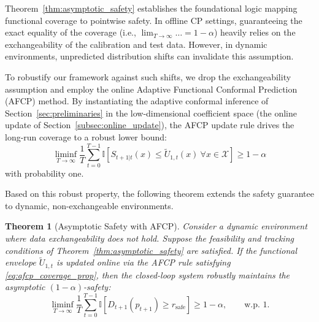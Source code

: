 \documentclass[lettersize,journal]{IEEEtran}
\newtheorem{theorem}{Theorem}
\begin{document}
Theorem~\ref{thm:asymptotic_safety} establishes the foundational logic mapping functional coverage to pointwise safety. In offline CP settings, guaranteeing the exact equality of the coverage (i.e., $\lim_{T\to\infty} \dots = 1-\alpha$) heavily relies on the exchangeability of the calibration and test data. However, in dynamic environments, unpredicted distribution shifts can invalidate this assumption.

To robustify our framework against such shifts, we drop the exchangeability assumption and employ the online Adaptive Functional Conformal Prediction (AFCP) method. By instantiating the adaptive conformal inference of Section~\ref{sec:preliminaries} in the low-dimensional coefficient space (the online update of Section~\ref{subsec:online_update}), the AFCP update rule drives the long-run coverage to a robust lower bound:
\begin{equation}
\liminf_{T\to\infty}\frac{1}{T}\sum_{t=0}^{T-1}
\mathbb I\!\left[
S_{t+1|t}(x)\le \widetilde U_{1,t}(x)\ \forall x\in\mathcal X
\right]
\ge
1-\alpha
\label{eq:afcp_coverage_prop}
\end{equation}
with probability one.

Based on this robust property, the following theorem extends the safety guarantee to dynamic, non-exchangeable environments.

\begin{theorem}[Asymptotic Safety with AFCP]
\label{thm:asymptotic_safety_afcp}
Consider a dynamic environment where data exchangeability does not hold. Suppose the feasibility and tracking conditions of Theorem~\ref{thm:asymptotic_safety} are satisfied. If the functional envelope $\widetilde U_{1,t}$ is updated online via the AFCP rule satisfying \eqref{eq:afcp_coverage_prop}, then the closed-loop system robustly maintains the asymptotic $(1-\alpha)$-safety:
\begin{equation}
\liminf_{T \to \infty}
\frac{1}{T}\sum_{t=0}^{T-1}
\mathbb{I}\!\left[ D_{t+1}(p_{t+1}) \ge r_{\mathrm{safe}} \right]
\ge 1-\alpha,
\qquad \text{w.p. 1.}
\end{equation}
\end{theorem}
\end{document}
